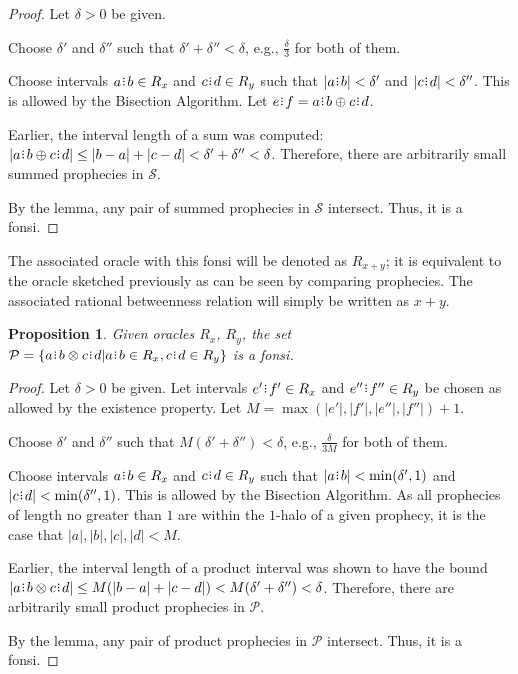 \documentclass[12pt]{article}
\newtheorem{proposition}{Proposition}[section]
\begin{document}
\begin{proof}

    Let $\delta > 0$ be given. 

    Choose $\delta'$ and $\delta''$ such that $\delta' + \delta'' < \delta$, e.g., $\frac{\delta}{3}$ for both of them. 

    Choose intervals $a\rint b \in R_x$ and $c\rint d \in R_y$  such that  $|a\rint b| < \delta'$ and $|c\rint d| < \delta''$. This is allowed by the Bisection Algorithm. Let $e\rint f = a\rint b \oplus c\rint d$.
     
    Earlier, the interval length of a sum was computed:   $|a\rint b \oplus c\rint d| \leq |b-a| + |c-d| < \delta' + \delta'' < \delta$. Therefore, there are arbitrarily small summed prophecies in $\mathcal{S}$. 
    
    By the lemma, any pair of summed prophecies in $\mathcal{S}$ intersect. Thus, it is a fonsi. 
    
\end{proof}


The associated oracle with this fonsi will be denoted as $R_{x + y}$; it is equivalent to the oracle sketched previously as can be seen by comparing prophecies. The associated rational betweenness relation will simply be written as $x+y$. 

\begin{proposition}
    Given oracles $R_x$, $R_y$, the set $\mathcal{P} = \{a\rint b \otimes c\rint d| a\rint b \in R_x, c\rint d \in R_y\}$ is a fonsi. 
\end{proposition}

\begin{proof}

    Let $\delta > 0$ be given. Let intervals $e'\rint f' \in R_x$ and $e''\rint f'' \in R_y$ be chosen as allowed by the existence property. Let $M = \max(|e'|, |f'|, |e''|, |f''|) +1$. 

    Choose $\delta'$ and $\delta''$ such that $M(\delta' + \delta'') < \delta$, e.g., $\frac{\delta}{3M}$ for both of them. 

    Choose intervals $a\rint b \in R_x$ and $c\rint d \in R_y$  such that  $|a\rint b| < \min(\delta', 1)$ and $|c\rint d| < \min(\delta'', 1)$. This is allowed by the Bisection Algorithm. As all prophecies of length no greater than $1$ are within the $1$-halo of a given prophecy, it is the case that $|a|, |b|, |c|, |d| < M$. 
     
    Earlier, the interval length of a product interval was shown to have the bound   $|a\rint b \otimes c\rint d| \leq M (|b-a| + |c-d|) < M (\delta' + \delta'') < \delta$. Therefore, there are arbitrarily small product prophecies in $\mathcal{P}$. 
    
    By the lemma, any pair of product prophecies in $\mathcal{P}$ intersect. Thus, it is a fonsi. 
    
\end{proof}
\end{document}
